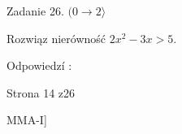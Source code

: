 \documentclass[a4paper,12pt]{article}
\begin{document}
Zadanie 26. $(0\rightarrow 2\rangle$

Rozwiąz nierówność $2x^{2}-3x>5.$

Odpowiedzí :

Strona 14 z26

MMA-I]
\end{document}

